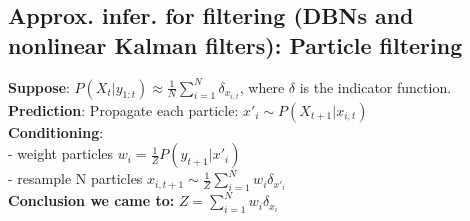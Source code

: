 \subsection{Approx. infer. for filtering (DBNs and nonlinear Kalman filters): Particle filtering}
\textbf{Suppose}: $P(X_t|y_{1:t})\approx \frac{1}{N}\sum_{i=1}^N \delta_{x_{i, t}}$, where $\delta$ is the indicator function.
\textbf{Prediction}: Propagate each particle: $x'_i \sim P(X_{t+1}|x_{i,t})$\\
\textbf{Conditioning}:\\
- weight particles $w_i=\frac{1}{Z}P(y_{t+1}|x'_i)$\\
- resample N particles $x_{i, t+1}  \sim \frac{1}{Z} \sum_{i=1}^N w_i \delta_{x'_i}$\\
\textbf{Conclusion we came to:} $Z =\sum_{i=1}^N w_i \delta_{x_i}$
